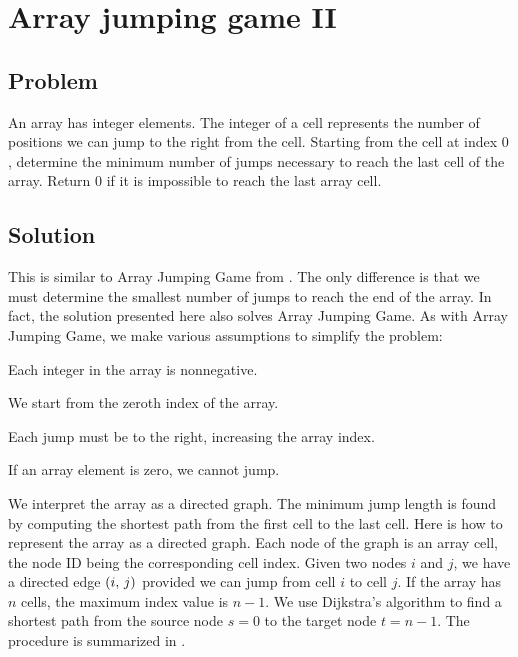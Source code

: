 
\section{Array jumping game II}



\subsection*{Problem}

An array has integer elements.  The integer of a cell represents the
number of positions we can jump to the right from the cell.  Starting
from the cell at index $0$, determine the minimum number of jumps
necessary to reach the last cell of the array.  Return $0$ if it is
impossible to reach the last array cell.



\subsection*{Solution}

This is similar to Array Jumping Game
from .  The only difference is that
we must determine the smallest number of jumps to reach the end of the
array.  In fact, the solution presented here also solves Array Jumping
Game.  As with Array Jumping Game, we make various assumptions to
simplify the problem:

\begin{packedenumeral}
\item Each integer in the array is nonnegative.
\item We start from the zeroth index of the array.
\item Each jump must be to the right, increasing the array index.
\item If an array element is zero, we cannot jump.
\end{packedenumeral}

We interpret the array as a directed graph.  The minimum jump length
is found by computing the shortest path from the first cell to the
last cell.  Here is how to represent the array as a directed graph.
Each node of the graph is an array cell, the node ID being the
corresponding cell index.  Given two nodes $i$ and $j$, we have a
directed edge $\left( {i},\, {j} \right)$ provided we can jump from cell $i$ to cell
$j$.  If the array has $n$ cells, the maximum index value is $n - 1$.
We use Dijkstra's algorithm to find a shortest path from the source
node $s = 0$ to the target node $t = n - 1$.  The procedure is
summarized in .

